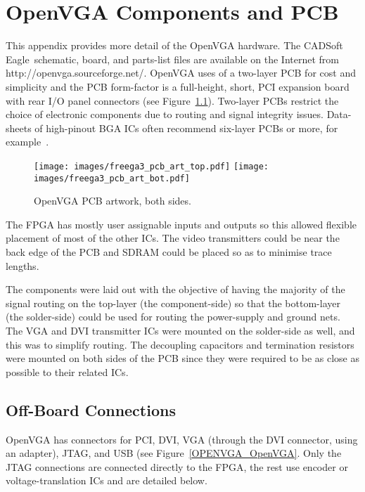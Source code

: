 \chapter{OpenVGA Components and PCB}
\label{HARDWARE}

This appendix provides more detail of the OpenVGA hardware. The CADSoft
Eagle\texttrademark~schematic, board, and parts-list files are available on the
Internet from http://openvga.sourceforge.net/. OpenVGA uses of a two-layer PCB
for cost and simplicity and the PCB form-factor is a full-height, short, PCI
expansion board with rear I/O panel connectors (see Figure~\ref{HARDWARE__PCB}).
Two-layer PCBs restrict the choice of electronic components due to routing and
signal integrity issues. Data-sheets of high-pinout BGA ICs often recommend
six-layer PCBs or more, for example~\cite{Xilinx_SP3_DS}.

\begin{figure}[h!]
\begin{center}
\texttt{[image: images/freega3\_pcb\_art\_top.pdf]}
\texttt{[image: images/freega3\_pcb\_art\_bot.pdf]}
\end{center}
\caption[OpenVGA PCB artwork, both sides]{OpenVGA PCB artwork, both sides.}
\label{HARDWARE__PCB}
\end{figure}


The FPGA has mostly user assignable inputs and outputs so this allowed flexible
placement of most of the other ICs. The video transmitters could be near the back
edge of the PCB and SDRAM could be placed so as to minimise trace lengths.

The components were laid out with the objective of having the majority of the
signal routing on the top-layer (the component-side) so that the bottom-layer
(the solder-side) could be used for routing the power-supply and ground nets. The
VGA and DVI transmitter ICs were mounted on the solder-side as well, and this was
to simplify routing. The decoupling capacitors and termination resistors were
mounted on both sides of the PCB since they were required to be as close as
possible to their related ICs.


\section{Off-Board Connections}
OpenVGA has connectors for PCI, DVI, VGA (through the DVI connector, using an
adapter), JTAG, and USB (see Figure~\ref{OPENVGA_OpenVGA}. Only the JTAG
connections are connected directly to the FPGA, the rest use encoder or
voltage-translation ICs and are detailed below.


